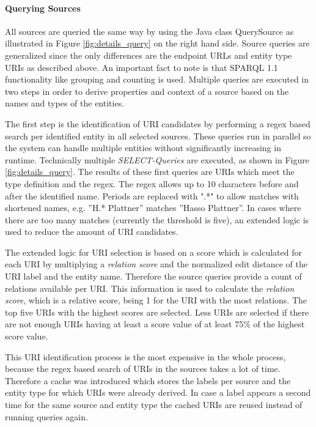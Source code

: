 \paragraph{Querying Sources}
All sources are queried the same way by using the Java class QuerySource as illustrated in Figure \ref{fig:details_query} on the right hand side. Source queries are generalized since the only differences are the endpoint URLs and entity type URIs as described above. An important fact to note is that SPARQL 1.1 functionality like grouping and counting is used. Multiple queries are executed in two steps in order to derive properties and context of a source based on the names and types of the entities.

The first step is the identification of URI candidates by performing a regex based search per identified entity in all selected sources. These queries run in parallel so the system can handle multiple entities without significantly increasing in runtime. Technically multiple \textit{SELECT-Queries} are executed, as shown in Figure \ref{fig:details_query}. The results of these first queries are URIs which meet the type definition and the regex. The regex allows up to 10 characters before and after the identified name. Periods are replaced with ".*" to allow matches with shortened names,  e.g. ''H.* Plattner'' matches ''Hasso Plattner''. In cases where there are too many matches (currently the threshold is five), an extended logic is used to reduce the amount of URI candidates. 


The extended logic for URI selection is based on a score which is calculated for each URI by multiplying a \textit{relation score} and the normalized edit distance of the URI label and the entity name. Therefore the source queries provide a count of relations available per URI. This information is used to calculate the \textit{relation score}, which is a relative score, being 1 for the URI with the most relations. The top five URIs with the highest scores are selected. Less URIs are selected if there are not enough URIs having at least a score value of at least 75\% of the highest score value.

This URI identification process is the most expensive in the whole process, because the regex based search of URIs in the sources takes a lot of time. Therefore a cache was introduced which stores the labels per source and the entity type for which URIs were already derived. In case a label appears a second time for the same source and entity type the cached URIs are reused instead of running queries again.


